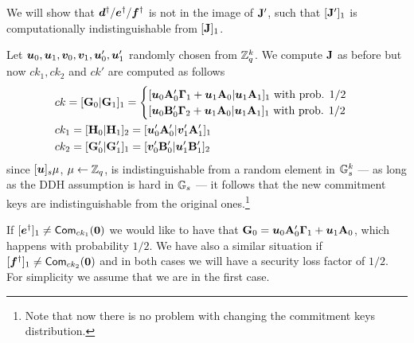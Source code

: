 We will show that ${\boldsymbol{d}}^\dag/ {\boldsymbol{e}}^\dag/ {\boldsymbol{f}}^\dag$ is not in the image of $\mathbf{{J}}'$, such that $[\mathbf{{J}}']_1$ is computationally indistinguishable from $[\mathbf{{J}}]_1$.

Let ${\boldsymbol{u}}_0,{\boldsymbol{u}}_1,{\boldsymbol{v}}_0,{\boldsymbol{v}}_1,{\boldsymbol{u}}'_0,{\boldsymbol{u}}'_1$ randomly chosen from $\mathbb{Z}_q^k$. We compute $\mathbf{{J}}$ as before but now $ck_1,ck_2$ and $ck'$ are computed as follows
\begin{align}
&ck = [\matr{G}_0|\matr{G}_1]_1 =
\begin{cases}
[\vecb{u}_0\matr{A}'_{0}\matr{\Gamma}_1+\vecb{u}_1\matr{A}_0|\vecb{u}_1\matr{A}_1]_1 \text{ with prob. } 1/2\\
[\vecb{u}_0\matr{B}'_{0}\matr{\Gamma}_2+\vecb{u}_1\matr{A}_0|\vecb{u}_1\matr{A}_1]_1 \text{ with prob. } 1/2
\end{cases}
\nonumber \\
&ck_1 = [\matr{H}_0|\matr{H}_1]_2 = [\vecb{u}'_0\matr{A}'_{0}|\vecb{v}'_1\matr{A}'_1]_1 \nonumber \\
&ck_2=  [\matr{G}'_0|\matr{G}'_1]_1 = [\vecb{v}'_0\matr{B}'_0|\vecb{u}'_1\matr{B}'_1]_2 \label{eq:ck-dist2}
\end{align}
since $[{\boldsymbol{u}}]_s\mu$, $\mu\gets \mathbb{Z}_q$, is indistinguishable from a random element in $\mathbb{G}_s^k$ --- as long as the DDH assumption is hard in $\mathbb{G}_s$ --- it follows that the new commitment keys are indistinguishable from the original ones.\footnote{Note that now there is no problem with changing the commitment keys distribution.}

If $[{\boldsymbol{e}}^\dag]_1 \neq\mathsf{Com}_{ck_1}({\boldsymbol{0}})$ we would like to have that $\mathbf{{G}}_0 = {\boldsymbol{u}}_0\mathbf{{A}}'_0\mathbf{{\Gamma}}_1 + {\boldsymbol{u}}_1\mathbf{{A}}_0$, which happens with probability $1/2$. We have also a similar situation if $[{\boldsymbol{f}}^\dag]_1 \neq\mathsf{Com}_{ck_2}({\boldsymbol{0}})$ and in both cases we will have a security loss factor of $1/2$. For simplicity we assume that we are in the first case.

